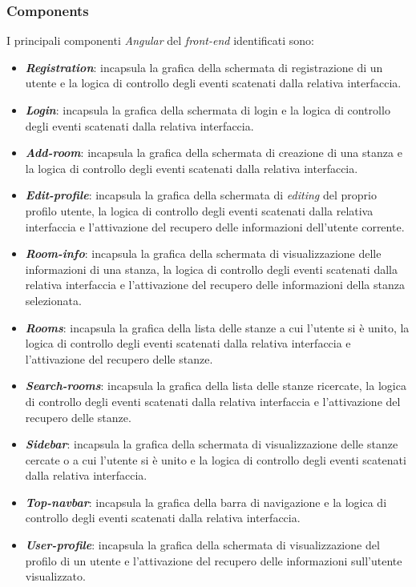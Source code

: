 \subsubsection{Components}
I principali componenti \textit{Angular} del \textit{front-end} identificati sono:
\begin{itemize}
    \item \textit{\textbf{Registration}}: incapsula la grafica della schermata di registrazione di un utente e la logica di controllo degli eventi scatenati dalla relativa interfaccia.
    \item \textit{\textbf{Login}}: incapsula la grafica della schermata di login e la logica di controllo degli eventi scatenati dalla relativa interfaccia.
    \item \textit{\textbf{Add-room}}: incapsula la grafica della schermata di creazione di una stanza e la logica di controllo degli eventi scatenati dalla relativa interfaccia.
    \item \textit{\textbf{Edit-profile}}: incapsula la grafica della schermata di \textit{editing} del proprio profilo utente, la logica di controllo degli eventi scatenati dalla relativa interfaccia e l'attivazione del recupero delle informazioni dell'utente corrente.
    \item \textit{\textbf{Room-info}}: incapsula la grafica della schermata di visualizzazione delle informazioni di una stanza, la logica di controllo degli eventi scatenati dalla relativa interfaccia e l'attivazione del recupero delle informazioni della stanza selezionata.
    \item \textit{\textbf{Rooms}}: incapsula la grafica della lista delle stanze a cui l'utente si è unito, la logica di controllo degli eventi scatenati dalla relativa interfaccia e l'attivazione del recupero delle stanze.
    \item \textit{\textbf{Search-rooms}}: incapsula la grafica della lista delle stanze ricercate, la logica di controllo degli eventi scatenati dalla relativa interfaccia e l'attivazione del recupero delle stanze. 
    \item \textit{\textbf{Sidebar}}: incapsula la grafica della schermata di visualizzazione delle stanze cercate o a cui l'utente si è unito e la logica di controllo degli eventi scatenati dalla relativa interfaccia.
    \item \textit{\textbf{Top-navbar}}: incapsula la grafica della barra di navigazione e la logica di controllo degli eventi scatenati dalla relativa interfaccia.
    \item \textit{\textbf{User-profile}}: incapsula la grafica della schermata di visualizzazione del profilo di un utente e l'attivazione del recupero delle informazioni sull'utente visualizzato.
\end{itemize}

